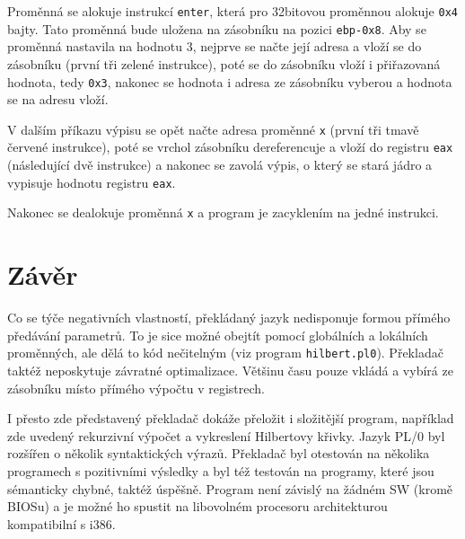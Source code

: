 \documentclass[a4paper]{article}
\begin{document}
Prom\v{e}nn\'a se alokuje instrukc\'i \texttt{enter}, kter\'a pro 32bitovou
prom\v{e}nnou alokuje \texttt{0x4} bajty. Tato prom\v{e}nn\'a bude ulo\v{z}ena
na z\'asobn\'iku na pozici \texttt{ebp-0x8}. Aby se prom\v{e}nn\'a nastavila na
hodnotu 3, nejprve se na\v{c}te jej\'i adresa a vlo\v{z}\'i se do z\'asobn\'iku
(prvn\'i t\v{r}i zelen\'e instrukce), pot\'e se do z\'asobn\'iku vlo\v{z}\'i i
p\v{r}i\v{r}azovan\'a hodnota, tedy \texttt{0x3}, nakonec se hodnota i adresa
ze z\'asobn\'iku vyberou a hodnota se na adresu vlo\v{z}\'i.

V dal\v{s}\'im p\v{r}\'ikazu v\'ypisu se op\v{e}t na\v{c}te adresa
prom\v{e}nn\'e \texttt{x} (prvn\'i t\v{r}i tmav\v{e} \v{c}erven\'e instrukce),
pot\'e se vrchol z\'asobn\'iku dereferencuje a vlo\v{z}\'i do registru
\texttt{eax} (n\'asleduj\'ic\'i dv\v{e} instrukce) a nakonec se zavol\'a
v\'ypis, o kter\'y se star\'a j\'adro a vypisuje hodnotu registru \texttt{eax}.

Nakonec se dealokuje prom\v{e}nn\'a \texttt{x} a program je 
zacyklen\'im na jedn\'e instrukci.

\section{Z\'av\v{e}r}
Co se t\'y\v{c}e negativn\'ich vlastnost\'i, p\v{r}ekl\'adan\'y jazyk
nedisponuje formou p\v{r}\'im\'eho p\v{r}ed\'av\'an\'i parametr\r{u}.
To je sice mo\v{z}n\'e obejt\'it pomoc\'i glob\'aln\'ich a lok\'aln\'ich
prom\v{e}nn\'ych, ale d\v{e}l\'a to k\'od ne\v{c}iteln\'ym (viz program
\texttt{hilbert.pl0}). P\v{r}eklada\v{c} takt\'e\v{z} neposkytuje
z\'avratn\'e optimalizace. V\v{e}t\v{s}inu \v{c}asu pouze vkl\'ad\'a
a vyb\'ir\'a ze z\'asobn\'iku m\'isto p\v{r}\'im\'eho v\'ypo\v{c}tu v
registrech.

I p\v{r}esto zde p\v{r}edstaven\'y p\v{r}eklada\v{c} dok\'a\v{z}e
p\v{r}elo\v{z}it i slo\v{z}it\v{e}j\v{s}\'i program, nap\v{r}\'i\-klad zde
uveden\'y rekurzivn\'i v\'ypo\v{c}et a vykreslen\'i Hilbertovy k\v{r}ivky.
Jazyk PL/0 byl roz\v{s}\'i\v{r}en o n\v{e}kolik syntaktick\'ych v\'yraz\r{u}.
P\v{r}eklada\v{c} byl otestov\'an na n\v{e}kolika programech s pozitivn\'imi
v\'ysledky a byl t\'e\v{z} testov\'an na programy, kter\'e jsou s\'emanticky
chybn\'e, takt\'e\v{z} \'usp\v{e}\v{s}n\v{e}. Program nen\'i z\'avisl\'y
na \v{z}\'adn\'em SW (krom\v{e} BIOSu) a je mo\v{z}n\'e ho spustit
na libovoln\'em procesoru architekturou kompatibiln\'i s i386.
\end{document}
